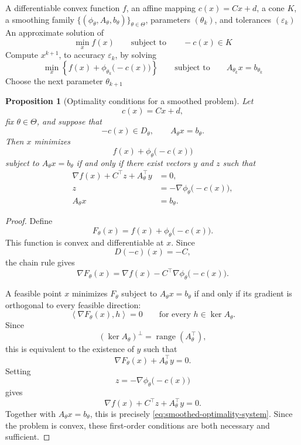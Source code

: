 \documentclass[a4paper,11pt]{book}
\theoremstyle{plain}
\newtheorem{proposition}[theorem]{Proposition}
\theoremstyle{definition}
\theoremstyle{remark}
\numberwithin{equation}{chapter}
\numberwithin{algorithm}{chapter}
\newcommand{\inner}[2]{\left\langle #1, #2 \right\rangle}
\newcommand{\range}{\operatorname{range}}
\begin{document}
	\begin{algorithm}[H]
		\caption{Penalty method based on a smoothing family}
		\begin{algorithmic}[1]
			\Require A differentiable convex function \(f\), an affine mapping
			\(c(x)=Cx+d\), a cone \(K\), a smoothing family
			\(\{(\phi_\theta,A_\theta,b_\theta)\}_{\theta\in\Theta}\), parameters
			\((\theta_k)\), and tolerances \((\varepsilon_k)\)
			\Ensure An approximate solution of
			\[
			\min_x f(x)
			\qquad
			\text{subject to}
			\qquad
			-c(x)\in K
			\]
			\State Compute \(x^{k+1}\), to accuracy \(\varepsilon_k\), by solving
			\[
			\min_x
			\left\{
			f(x)+\phi_{\theta_k}\bigl(-c(x)\bigr)
			\right\}
			\qquad
			\text{subject to}
			\qquad
			A_{\theta_k}x=b_{\theta_k}
			\]
			\State Choose the next parameter \(\theta_{k+1}\)
			\EndFor
		\end{algorithmic}
	\end{algorithm}
	
	\begin{proposition}[Optimality conditions for a smoothed problem]
		Let
		\[
		c(x)=Cx+d,
		\]
		fix \(\theta\in\Theta\), and suppose that
		\[
		-c(x)\in D_\theta,
		\qquad
		A_\theta x=b_\theta.
		\]
		Then \(x\) minimizes
		\[
		f(x)+\phi_\theta\bigl(-c(x)\bigr)
		\]
		subject to \(A_\theta x=b_\theta\) if and only if there exist vectors
		\(y\) and \(z\) such that
		\begin{equation}
			\begin{aligned}
				\nabla f(x)+C^\top z+A_\theta^\top y&=0,\\
				z&=-\nabla\phi_\theta\bigl(-c(x)\bigr),\\
				A_\theta x&=b_\theta.
			\end{aligned}
			\label{eq:smoothed-optimality-system}
		\end{equation}
	\end{proposition}
	
	\begin{proof}
		Define
		\[
		F_\theta(x)
		=
		f(x)+\phi_\theta\bigl(-c(x)\bigr).
		\]
		This function is convex and differentiable at \(x\). Since
		\[
		D(-c)(x)=-C,
		\]
		the chain rule gives
		\[
		\nabla F_\theta(x)
		=
		\nabla f(x)
		-
		C^\top\nabla\phi_\theta\bigl(-c(x)\bigr).
		\]
		
		A feasible point \(x\) minimizes \(F_\theta\) subject to
		\(A_\theta x=b_\theta\) if and only if its gradient is orthogonal to every
		feasible direction:
		\[
		\inner{\nabla F_\theta(x)}{h}=0
		\qquad
		\text{for every }h\in\ker A_\theta.
		\]
		Since
		\[
		(\ker A_\theta)^\perp=\range(A_\theta^\top),
		\]
		this is equivalent to the existence of \(y\) such that
		\[
		\nabla F_\theta(x)+A_\theta^\top y=0.
		\]
		Setting
		\[
		z=-\nabla\phi_\theta\bigl(-c(x)\bigr)
		\]
		gives
		\[
		\nabla f(x)+C^\top z+A_\theta^\top y=0.
		\]
		Together with \(A_\theta x=b_\theta\), this is precisely
		\eqref{eq:smoothed-optimality-system}. Since the problem is convex, these
		first-order conditions are both necessary and sufficient.
	\end{proof}
	
\end{document}
